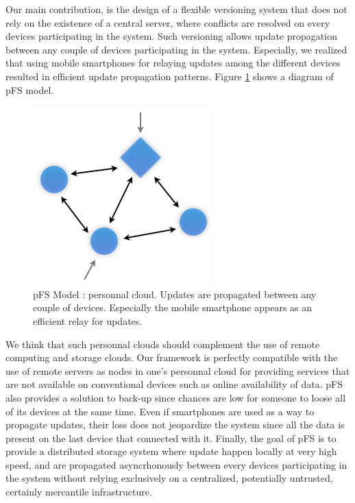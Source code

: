 Our main contribution, is the design of a flexible versioning system
that does not rely on the existence of a central server, where
conflicts are resolved on every devices participating in the
system. Such versioning allows update propagation between any couple
of devices participating in the system. Especially, we realized that
using mobile smartphones for relaying updates among the different
devices resulted in efficient update propagation patterns. Figure
\ref{PfsModel} shows a diagram of pFS model.

\begin{figure}[ht]
\begin{center}
  \includegraphics [scale=0.5] {img/pfs_model}
  \caption{\label{PfsModel} {\small pFS Model : personnal
      cloud. Updates are propagated between any couple of
      devices. Especially the mobile smartphone appears as an
      efficient relay for updates. }}
\end{center}
\end{figure}

We think that such personnal clouds should complement the use of
remote computing and storage clouds. Our framework is perfectly
compatible with the use of remote servers as nodes in one's personnal
cloud for providing services that are not available on conventional
devices such as online availability of data. pFS also provides a
solution to back-up since chances are low for someone to loose all of
its devices at the same time. Even if smartphones are used as a way to
propagate updates, their loss does not jeopardize the system since all
the data is present on the last device that connected with
it. Finally, the goal of pFS is to provide a distributed storage
system where update happen locally at very high speed, and are
propagated asyncrhonously between every devices participating in the
system without relying exclusively on a centralized, potentially
untrusted, certainly mercantile infrastructure.


